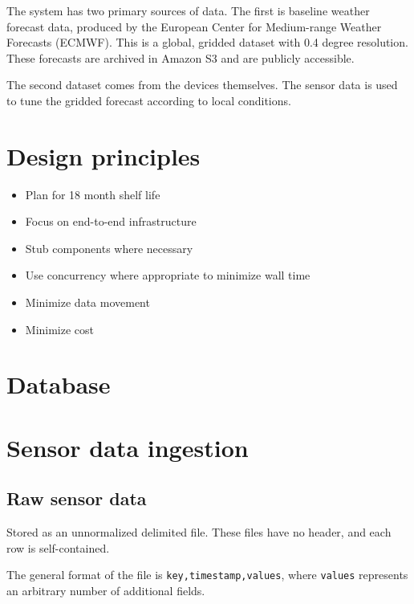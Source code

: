 \documentclass[
]{book}
\providecommand{\tightlist}{%
  \setlength{\itemsep}{0pt}\setlength{\parskip}{0pt}}
\begin{document}
The system has two primary sources of data. The first is baseline
weather forecast data, produced by the European Center for Medium-range
Weather Forecasts (ECMWF).
This is a global, gridded dataset with 0.4 degree resolution.
These forecasts are archived in Amazon S3 and are publicly accessible.

The second dataset comes from the devices themselves. The sensor data is
used to tune the gridded forecast according to local conditions.

\hypertarget{design-principles}{%
\section{Design principles}\label{design-principles}}

\begin{itemize}
\tightlist
\item
  Plan for 18 month shelf life
\item
  Focus on end-to-end infrastructure
\item
  Stub components where necessary
\item
  Use concurrency where appropriate to minimize wall time
\item
  Minimize data movement
\item
  Minimize cost
\end{itemize}

\hypertarget{database}{%
\section{Database}\label{database}}

\hypertarget{sensor-data-ingestion}{%
\section{Sensor data ingestion}\label{sensor-data-ingestion}}

\hypertarget{raw-sensor-data}{%
\subsection{Raw sensor data}\label{raw-sensor-data}}

Stored as an unnormalized delimited file.
These files have no header, and each row is self-contained.

The general format of the file is \texttt{key,timestamp,values},
where \texttt{values} represents an arbitrary number of additional fields.
\end{document}
